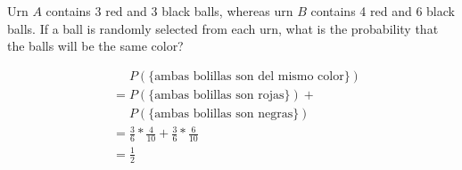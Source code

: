 \item  Urn $A$ contains 3 red and 3 black balls, whereas urn $B$ contains 4 red and 6 black balls. If a ball is randomly selected from each urn, what is the probability that the balls will be the same color?

\begin{align*}
    &\phantom{{}={}} P(\{\text{ambas bolillas son del mismo color}\})\\
    &= P(\{\text{ambas bolillas son rojas}\}) + {}\\
    &\phantom{{}={}} P(\{\text{ambas bolillas son negras}\})\\
    &= \tfrac{3}{6} * \tfrac{4}{10} + \tfrac{3}{6} * \tfrac{6}{10}\\
    &= \tfrac{1}{2}
\end{align*}